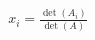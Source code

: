 \documentclass[preview]{standalone}
\begin{document}
\begin{align*}
x_i = \frac{\det(A_i)}{\det(A)}
\end{align*}
\end{document}
